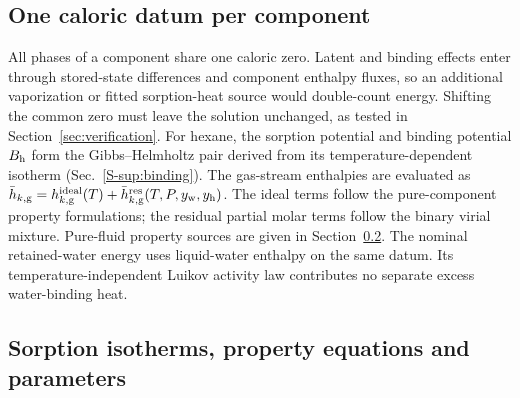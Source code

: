 \subsection{One caloric datum per component}
\label{sec:thermo:datum}

All phases of a component share one caloric zero. Latent and binding
effects enter through stored-state differences and component enthalpy
fluxes, so an additional vaporization or fitted sorption-heat source would
double-count energy. Shifting the common zero must leave the solution
unchanged, as tested in Section~\ref{sec:verification}. For hexane, the
sorption potential and binding potential $B_{\mathrm{h}}$ form the Gibbs--Helmholtz
pair derived from its temperature-dependent isotherm
(Sec.~\ref*{S-sup:binding}).
The gas-stream enthalpies are evaluated as
$\bar h_{k,\mathrm g}=h_{k,\mathrm g}^{\mathrm{ideal}}(T)
+\bar h_{k,\mathrm g}^{\mathrm{res}}(T,P,y_{\mathrm{w}},y_{\mathrm{h}})$.
The ideal terms follow the pure-component property formulations; the
residual partial molar terms follow the binary virial mixture.
Pure-fluid property sources are given in Section~\ref{sec:thermo:properties}.
The nominal retained-water energy uses liquid-water enthalpy on the same
datum. Its temperature-independent Luikov activity law contributes no
separate excess water-binding heat.

\subsection{Sorption isotherms, property equations and parameters}
\label{sec:thermo:properties}
\label{sec:thermo:gab}
\label{sec:thermo:binding}


